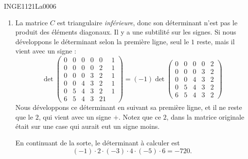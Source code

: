 

\begin{corrige}{INGE1121La0006}

	\begin{enumerate}

		\item
			La matrice $C$ est triangulaire \emph{inférieure}, donc son déterminant n'est pas le produit des éléments diagonaux. Il y a une subtilité sur les signes. Si nous développons le déterminant selon la première ligne, seul le $1$ reste, mais il vient avec un signe :
			\begin{equation}
				\det\begin{pmatrix}
					0	&	0	&	0	&	0	&	0	&	1\\	
					0	&	0	&	0	&	0	&	2	&	1\\
					0	&	0	&	0	&	3	&	2	&	1\\
					0	&	0	&	4	&	3	&	2	&	1\\
					0	&	5	&	4	&	3	&	2	&	1\\
					6	&	5	&	4	&	3	&	2		1
				\end{pmatrix}=
				(-1)\det
				\begin{pmatrix}
					0	&	0	&	0	&	0	&	2	\\
					0	&	0	&	0	&	3	&	2	\\
					0	&	0	&	4	&	3	&	2	\\
					0	&	5	&	4	&	3	&	2	\\
					6	&	5	&	4	&	3	&	2				
				\end{pmatrix}
			\end{equation}
			Nous développons ce déterminant en suivant sa première ligne, et il ne reste que le $2$, qui vient avec un signe $+$. Notez que ce $2$, dans la matrice originale était sur une case qui aurait eut un signe moins.

			En continuant de la sorte, le déterminant à calculer est
			\begin{equation}
				(-1)\cdot 2\cdot(-3)\cdot 4\cdot(-5)\cdot 6=-720.
			\end{equation}
		
	\end{enumerate}

\end{corrige}
